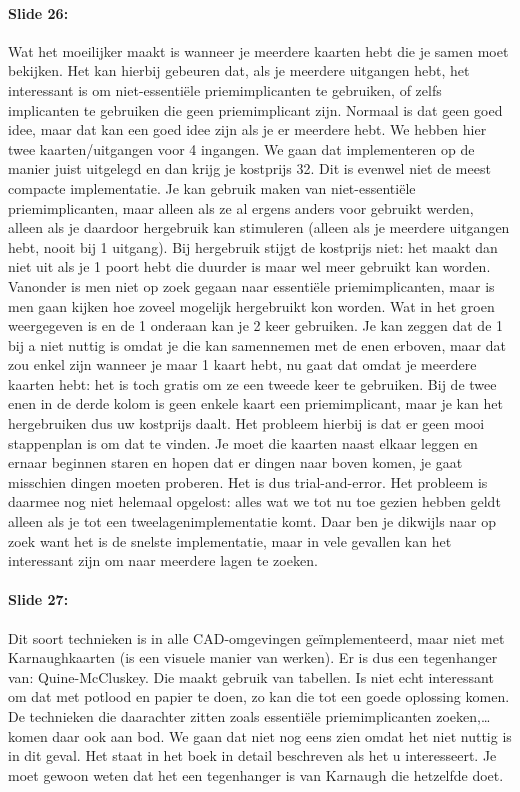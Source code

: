 \documentclass[10pt,a4paper]{book}
\begin{document}
\paragraph{Slide 26:} Wat het moeilijker maakt is wanneer je meerdere kaarten hebt die je samen moet bekijken. Het kan hierbij gebeuren dat, als je meerdere uitgangen hebt, het interessant is om niet-essenti\"ele priemimplicanten te gebruiken, of zelfs implicanten te gebruiken die geen priemimplicant zijn. Normaal is dat geen goed idee, maar dat kan een goed idee zijn als je er meerdere hebt. We hebben hier twee kaarten/uitgangen voor 4 ingangen. We gaan dat implementeren op de manier juist uitgelegd en dan krijg je kostprijs 32. Dit is evenwel niet de meest compacte implementatie. Je kan gebruik maken van niet-essenti\"ele priemimplicanten, maar alleen als ze al ergens anders voor gebruikt werden, alleen als je daardoor hergebruik kan stimuleren (alleen als je meerdere uitgangen hebt, nooit bij 1 uitgang). Bij hergebruik stijgt de kostprijs niet: het maakt dan niet uit als je 1 poort hebt die duurder is maar wel meer gebruikt kan worden.\\ 
Vanonder is men niet op zoek gegaan naar essenti\"ele priemimplicanten, maar is men gaan kijken hoe zoveel mogelijk hergebruikt kon worden. Wat in het groen weergegeven is en de 1 onderaan kan je 2 keer gebruiken. Je kan zeggen dat de 1 bij a niet nuttig is omdat je die kan samennemen met de enen erboven, maar dat zou enkel zijn wanneer je maar 1 kaart hebt, nu gaat dat omdat je meerdere kaarten hebt: het is toch gratis om ze een tweede keer te gebruiken. Bij de twee enen in de derde kolom is geen enkele kaart een priemimplicant, maar je kan het hergebruiken dus uw kostprijs daalt. Het probleem hierbij is dat er geen mooi stappenplan is om dat te vinden. Je moet die kaarten naast elkaar leggen en ernaar beginnen staren en hopen dat er dingen naar boven komen, je gaat misschien dingen moeten proberen. Het is dus trial-and-error. Het probleem is daarmee nog niet helemaal opgelost: alles wat we tot nu toe gezien hebben geldt alleen als je tot een tweelagenimplementatie komt. Daar ben je dikwijls naar op zoek want het is de snelste implementatie, maar in vele gevallen kan het interessant zijn om naar meerdere lagen te zoeken.

\paragraph{Slide 27:} Dit soort technieken is in alle CAD-omgevingen ge\"implementeerd, maar niet met Karnaughkaarten (is een visuele manier van werken). Er is dus een tegenhanger van: Quine-McCluskey. Die maakt gebruik van tabellen. Is niet echt interessant om dat met potlood en papier te doen, zo kan die tot een goede oplossing komen. De technieken die daarachter zitten zoals essenti\"ele priemimplicanten zoeken,\ldots komen daar ook aan bod. We gaan dat niet nog eens zien omdat het niet nuttig is in dit geval. Het staat in het boek in detail beschreven als het u interesseert. Je moet gewoon weten dat het een tegenhanger is van Karnaugh die hetzelfde doet.
\end{document}
